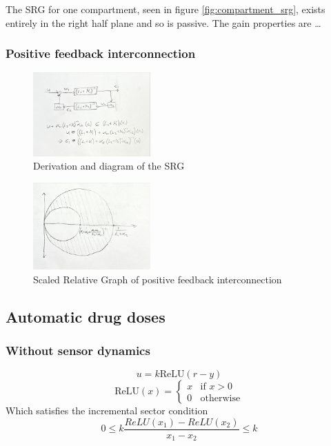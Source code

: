 \documentclass{article}
\begin{document}
The SRG for one compartment, seen in figure \ref{fig:compartment_srg}, exists entirely in the right half plane and so is passive.
The gain properties are \dots

\subsubsection{Positive feedback interconnection}

\begin{figure}[H]
    \centering
    \includegraphics[width=0.4\textwidth]{figures/feedback_components.jpg}
    \caption{Derivation and diagram of the SRG }
\end{figure}

\begin{figure}[H]
    \centering
    \includegraphics[width=0.4\textwidth]{figures/feedback_SRG.jpg}
    \caption{Scaled Relative Graph of positive feedback interconnection}
\end{figure}

\subsection{Automatic drug doses}

\subsubsection{Without sensor dynamics}

\begin{equation}
    u = k \text{ReLU}(r - y)
\end{equation}
\begin{equation}
    \text{ReLU}(x) = \begin{cases}
        x & \text{if } x > 0 \\
        0 & \text{otherwise}
    \end{cases}
\end{equation}
Which satisfies the incremental sector condition
\begin{equation}
    0 \leq k \frac{ReLU(x_1) - ReLU(x_2)}{x_1 - x_2} \leq k
\end{equation}
\end{document}
